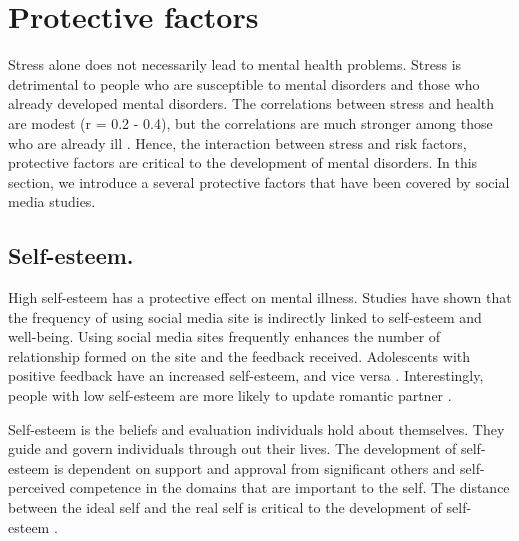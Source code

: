 
\section{Protective factors}
Stress alone does not necessarily lead to mental health problems. Stress is detrimental to people who are susceptible to mental disorders and those who already developed mental disorders. The correlations between stress and health are modest (r =  0.2 - 0.4), but the correlations are much stronger among those who are already ill \cite{aldwin2004interface}. Hence, the interaction between stress and risk factors, protective factors are critical to the development of mental disorders. In this section, we introduce a several protective factors that have been covered by social media studies.

\subsection{Self-esteem.}
High self-esteem has a protective effect on mental illness. Studies have shown that the frequency of using social media site is indirectly linked to self-esteem and well-being. Using social media sites frequently enhances the number of relationship formed on the site and the feedback received. Adolescents with positive feedback have an increased self-esteem, and vice versa \cite{valkenburg2006friend}. Interestingly, people with low self-esteem are more likely to update romantic partner \cite{marshall_big_2015}.

Self-esteem is the beliefs and evaluation individuals hold about themselves. They guide and govern individuals through out their lives. The development of self-esteem is dependent on support and approval from significant others and self-perceived competence in the domains that are important to the self. The distance between the ideal self and the real self is critical to the development of self-esteem \cite{burns1982self}. 

